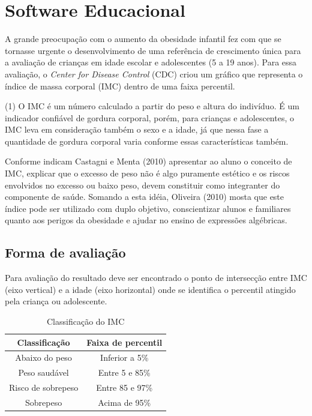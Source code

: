 \chapter{Software Educacional}
A grande preocupação com o aumento da obesidade infantil fez com que se tornasse
urgente o desenvolvimento de uma referência de crescimento única para a
avaliação de crianças em idade escolar e adolescentes (5 a 19 anos).
Para essa avaliação, o \emph{Center for Disease Control} (CDC) criou um gráfico
que representa o índice de massa corporal (IMC) dentro de uma faixa percentil.

(1) O IMC é um número calculado a partir do peso e altura do indivíduo. É um
indicador confiável de gordura corporal, porém, para crianças e adolescentes, o
IMC leva em consideração também o sexo e a idade, já que nessa fase a quantidade
de gordura corporal varia conforme essas características também.

Conforme indicam Castagni e Menta (2010) apresentar ao aluno o conceito de IMC,
explicar que o excesso de peso não é algo puramente estético e os riscos
envolvidos no excesso ou baixo peso, devem constituir como integranter do
componente de saúde. Somando a esta idéia, Oliveira (2010) mosta que este
índice pode ser utilizado com duplo objetivo, conscientizar alunos e familiares
quanto aos perigos da obesidade e ajudar no ensino de expressões algébricas.

    \section{Forma de avaliação}

    Para avaliação do resultado deve ser encontrado o ponto de intersecção entre
    IMC (eixo vertical) e a idade (eixo horizontal) onde se identifica o
    percentil atingido pela criança ou adolescente.

    \begin{table}
        \begin{center}
        \caption{Classificação do IMC}
        \begin{tabular}{cc} \hline
            \textbf{Classificação}  & \textbf{Faixa de percentil}   \\  \hline
            Abaixo do peso          & Inferior a 5\%                \\
            Peso saudável           & Entre 5 e 85\%                \\
            Risco de sobrepeso      & Entre 85 e 97\%               \\
            Sobrepeso               & Acima de 95\%
        \end{tabular}
        \end{center}
    \end{table}

